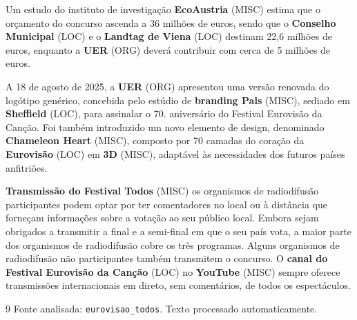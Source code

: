 \documentclass[12pt,a4paper]{article}
\begin{document}
Um estudo do instituto de investigação \textbf{EcoAustria} (MISC) estima que o orçamento do concurso ascenda a 36 milhões de euros, sendo que o \textbf{Conselho Municipal} (LOC) e o \textbf{Landtag de Viena} (LOC) destinam 22,6 milhões de euros, enquanto a \textbf{UER} (ORG) deverá contribuir com cerca de 5 milhões de euros.

A 18 de agosto de 2025, a \textbf{UER} (ORG) apresentou uma versão renovada do logótipo genérico, concebida pelo estúdio de \textbf{branding Pals} (MISC), sediado em \textbf{Sheffield} (LOC), para assinalar o 70. aniversário do Festival Eurovisão da Canção. Foi também introduzido um novo elemento de design, denominado \textbf{Chameleon Heart} (MISC), composto por 70 camadas do coração da \textbf{Eurovisão} (LOC) em \textbf{3D} (MISC), adaptável às necessidades dos futuros países anfitriões.



\textbf{Transmissão do Festival Todos} (MISC) os organismos de radiodifusão participantes podem optar por ter comentadores no local ou à distância que forneçam informações sobre a votação ao seu público local. Embora sejam obrigados a transmitir a final e a semi-final em que o seu país vota, a maior parte dos organismos de radiodifusão cobre os três programas. Alguns organismos de radiodifusão não participantes também transmitem o concurso. O \textbf{canal do Festival Eurovisão da Canção} (LOC) no \textbf{YouTube} (MISC) sempre oferece transmissões internacionais em direto, sem comentários, de todos os espectáculos.





\vspace{1cm}
\begin{thebibliography}{9}
    Fonte analisada: \texttt{eurovisao\_todos}. Texto processado automaticamente.
\end{thebibliography}
\end{document}
